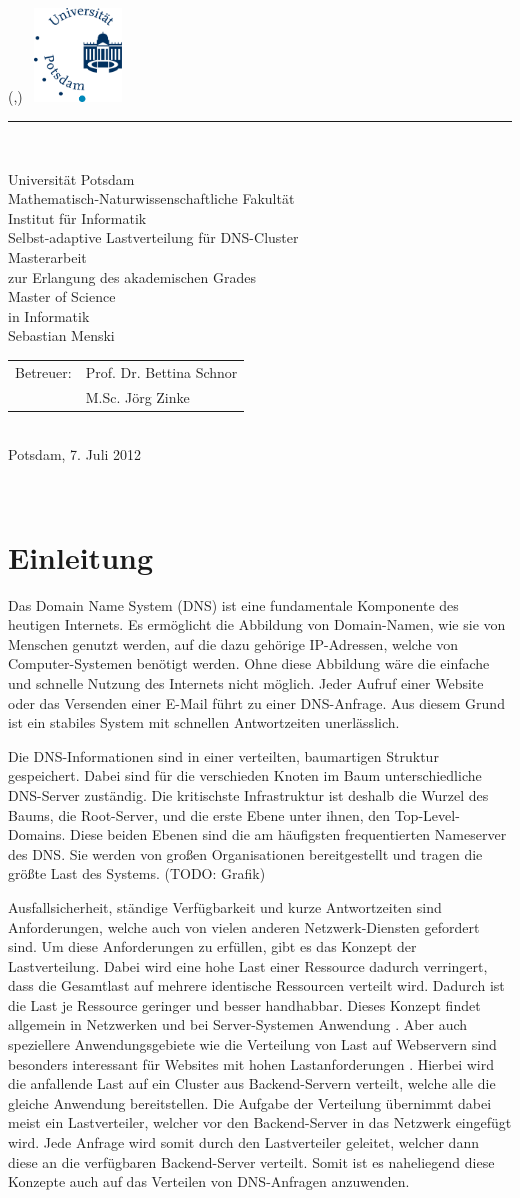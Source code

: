 \documentclass[a4paper, 12pt, BCOR10mm, DIV12, toc=bibliography, toc=listof, german]{scrbook}
\newlength{\TitleMargin}
\newlength{\TitleWidth}
\newcommand{\TitleUni}{Universität Potsdam}
\newcommand{\TitleInstitut}{Mathematisch-Naturwissenschaftliche Fakultät\\Institut für Informatik}
\newcommand{\TitleTitel}{Selbst-adaptive Lastverteilung für DNS-Cluster}
\newcommand{\TitleTyp}{Masterarbeit}
\newcommand{\TitleAutor}{Sebastian Menski}
\newcommand{\TitleBetreuerText}{Betreuer}
\newcommand{\TitleBetreuer}{Prof. Dr. Bettina Schnor\\ &M.Sc. Jörg Zinke}
\newcommand{\TitleAbschlussText}{zur Erlangung des akademischen Grades\\Master of Science\\in Informatik}
\newcommand{\TitleOrt}{Potsdam}
\newcommand{\TitleDatum}{7. Juli 2012}
\renewcommand{\maketitle}{
	\thispagestyle{empty}
	\begin{textblock*}{\TitleWidth}(\TitleMargin,\TitleMargin)
		~\hfill\includegraphics[height=2.5cm]{images/uni-logo}\\[3mm]
		{\color{uniblue}\rule{\TitleWidth}{1mm}}\\[5mm]
		{
			\centering
			\sffamily\Large
			{\LARGE\TitleUni}\\[0.5\baselineskip]
			{\large\TitleInstitut}\\[5\baselineskip]
			{\Huge\TitleTitel}\\[3\baselineskip]

			{\TitleTyp}\\
			\TitleAbschlussText\\[3\baselineskip]

			\TitleAutor\\[3\baselineskip]
			\begin{tabular}{rl}
				\TitleBetreuerText: & \TitleBetreuer
			\end{tabular}\\[2\baselineskip]
			\TitleOrt, \TitleDatum\par
		}
	\end{textblock*}
	~\clearpage
}
\def \dns {Domain Name System (DNS)}
\begin{document}
	\frontmatter
	\maketitle{}
	\tableofcontents{}

	\onehalfspacing{}
	\mainmatter
	\pagestyle{scrheadings}

	\chapter{Einleitung} %
	\label{cha:einleitung}

		Das \dns{} \cite{rfc1034, rfc1035} ist eine fundamentale Komponente des heutigen Internets. Es
		ermöglicht die Abbildung von Domain-Namen, wie sie von Menschen genutzt werden, auf die dazu
		gehörige IP-Adressen, welche von Computer-Systemen benötigt werden. Ohne diese Abbildung wäre
		die einfache und schnelle Nutzung des Internets nicht möglich. Jeder Aufruf einer Website oder
		das Versenden einer E-Mail führt zu einer DNS-Anfrage. Aus diesem Grund ist ein stabiles System
		mit schnellen Antwortzeiten unerlässlich.
		
		Die DNS-Informationen sind in einer verteilten, baumartigen Struktur gespeichert.  Dabei sind für
		die verschieden Knoten im Baum unterschiedliche DNS-Server zuständig. Die kritischste
		Infrastruktur ist deshalb die Wurzel des Baums, die Root-Server, und die erste Ebene unter
		ihnen, den Top-Level-Domains. Diese beiden Ebenen sind die am häufigsten frequentierten
		Nameserver des DNS. Sie werden von großen Organisationen bereitgestellt und tragen die größte
		Last des Systems. (TODO: Grafik)

		Ausfallsicherheit, ständige Verfügbarkeit und kurze Antwortzeiten sind Anforderungen, welche
		auch von vielen anderen Netzwerk-Diensten gefordert sind. Um diese Anforderungen zu erfüllen,
		gibt es das Konzept der Lastverteilung. Dabei wird eine hohe Last einer Ressource dadurch
		verringert, dass die Gesamtlast auf mehrere identische Ressourcen verteilt wird. Dadurch ist die
		Last je Ressource geringer und besser handhabbar. Dieses Konzept findet allgemein in Netzwerken
		und bei Server-Systemen Anwendung \cite{bourke2001, kopparapu2002}. Aber auch speziellere
		Anwendungsgebiete wie die Verteilung von Last auf Webservern sind besonders interessant für
		Websites mit hohen Lastanforderungen \cite{meplho2012}. Hierbei wird die anfallende Last auf ein
		Cluster aus Backend-Servern verteilt, welche alle	die gleiche Anwendung bereitstellen. Die
		Aufgabe der Verteilung übernimmt dabei meist ein Lastverteiler, welcher vor den Backend-Server
		in das Netzwerk eingefügt wird. Jede Anfrage wird somit durch den Lastverteiler geleitet,
		welcher dann diese an die verfügbaren Backend-Server verteilt.  Somit ist es naheliegend diese
		Konzepte auch auf das Verteilen von DNS-Anfragen anzuwenden.
\end{document}
